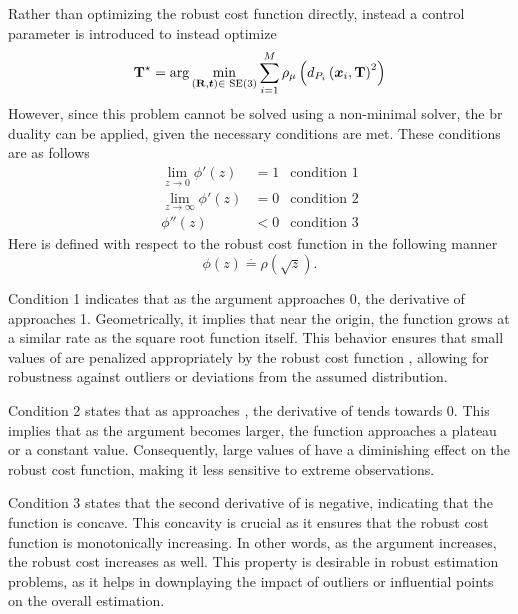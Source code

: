 Rather than optimizing the robust cost function \mvar{\rho(\cdot)} directly, instead a control parameter \mvar{\mu} is introduced to instead optimize
%
\begin{equation}
	\tf[T]{\star}{}=\arg \min_{(\mat{R},\vec{t})\in\SE (3)} \sum^M_{i=1} \rho_\mu \left(d_{P_i}\left(\vec{x}_i, \mat{T} \right)^{2}\right)
\end{equation}
However, since this problem cannot be solved using a non-minimal solver, the \gls{br} duality can be applied, given the necessary conditions are met. These conditions are as follows
%
\begin{align}\label{eq:br-condition-1-2-3}
	\lim_{z\rightarrow 0} \phi'(z) &= 1 & \text{condition 1} \\
	\lim_{z\rightarrow \infty}\phi'(z) &= 0 & \text{condition 2} \\
	\phi''(z) &< 0 & \text{condition 3}
\end{align}
Here  is defined with respect to the robust cost function \mvar{\rho} in the following manner
%
\begin{equation}
	\phi(z) \overset{\cdot}{=} \rho(\sqrt{z}).
\end{equation}

Condition 1 indicates that as the argument  approaches \num{0}, the derivative of  approaches \num{1}. Geometrically, it implies that near the origin, the function  grows at a similar rate as the square root function itself. This behavior ensures that small values of  are penalized appropriately by the robust cost function \mvar{\rho(\cdot)}, allowing for robustness against outliers or deviations from the assumed distribution. \medskip

Condition 2 states that as  approaches \mvar{\infty}, the derivative of  tends towards \num{0}. This implies that as the argument becomes larger, the function  approaches a plateau or a constant value. Consequently, large values of  have a diminishing effect on the robust cost function, making it less sensitive to extreme observations. \medskip

Condition 3 states that the second derivative of  is negative, indicating that the function  is concave. This concavity is crucial as it ensures that the robust cost function \mvar{\rho(\cdot)} is monotonically increasing. In other words, as the argument  increases, the robust cost increases as well. This property is desirable in robust estimation problems, as it helps in downplaying the impact of outliers or influential points on the overall estimation. \medskip

